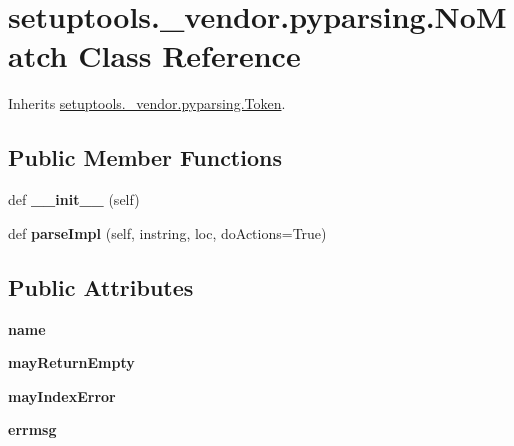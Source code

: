 \hypertarget{classsetuptools_1_1__vendor_1_1pyparsing_1_1_no_match}{}\section{setuptools.\+\_\+vendor.\+pyparsing.\+No\+Match Class Reference}
\label{classsetuptools_1_1__vendor_1_1pyparsing_1_1_no_match}


Inherits \hyperlink{classsetuptools_1_1__vendor_1_1pyparsing_1_1_token}{setuptools.\+\_\+vendor.\+pyparsing.\+Token}.

\subsection*{Public Member Functions}
\begin{DoxyCompactItemize}
\item 
\mbox{\label{classsetuptools_1_1__vendor_1_1pyparsing_1_1_no_match_a61fe048c1bd0e138e93e649628206718}} 
def {\bfseries \+\_\+\+\_\+init\+\_\+\+\_\+} (self)
\item 
\mbox{\label{classsetuptools_1_1__vendor_1_1pyparsing_1_1_no_match_a8f6c1548746715d3902fd7b0892186df}} 
def {\bfseries parse\+Impl} (self, instring, loc, do\+Actions=True)
\end{DoxyCompactItemize}
\subsection*{Public Attributes}
\begin{DoxyCompactItemize}
\item 
\mbox{\label{classsetuptools_1_1__vendor_1_1pyparsing_1_1_no_match_ac0da66f8d777d1141cc224fcf0cf4683}} 
{\bfseries name}
\item 
\mbox{\label{classsetuptools_1_1__vendor_1_1pyparsing_1_1_no_match_a416af965dafd88e7d40a5b0ada5cfb7c}} 
{\bfseries may\+Return\+Empty}
\item 
\mbox{\label{classsetuptools_1_1__vendor_1_1pyparsing_1_1_no_match_aa6f6d162859db630e761c843a2fbdd82}} 
{\bfseries may\+Index\+Error}
\item 
\mbox{\label{classsetuptools_1_1__vendor_1_1pyparsing_1_1_no_match_aa574fc683137df9b3571da441035205b}} 
{\bfseries errmsg}
\end{DoxyCompactItemize}
